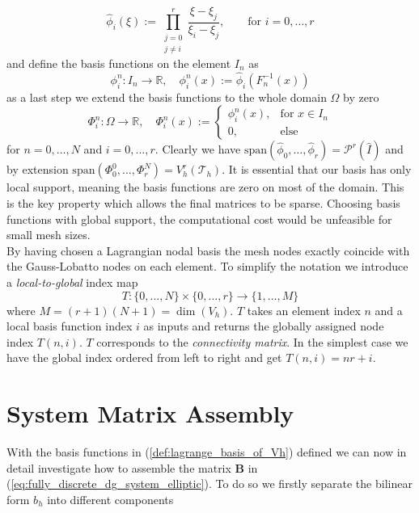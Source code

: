 \begin{equation}
	\label{def:lagrange_ref_basis}
	\widehat{\phi}_i(\xi) := \prod_{\substack{j = 0 \\ j\neq i}}^{r}\frac{\xi - \xi_j}{\xi_i - \xi_j},
	\qquad \text{for } i=0,\ldots,r
\end{equation}
and define the basis functions on the element $I_n$ as
\begin{equation}
	\phi^n_i : I_n \to \mathbb{R}, \quad \phi^n_i(x) := \widehat{\phi}_i(F_n^{-1}(x))
	\nonumber
\end{equation}
as a last step we extend the basis functions to the whole domain $\Omega$ by zero
\begin{equation}
	\Phi_i^n: \Omega \to \mathbb{R}, \quad \Phi_i^n(x) :=
	\begin{cases}
		\phi_i^n(x), & \text{for } x\in I_n \\
		0,           & \text{else}
	\end{cases}
	\label{def:lagrange_basis_of_Vh}
\end{equation}
for $n=0,\ldots,N$ and $i=0,\ldots,r$. Clearly we have $\text{span}( \widehat{\phi}_0, \ldots, \widehat{\phi}_r) = \mathcal{P}^r(\hat{I})$
and by extension $\text{span}(\Phi_0^0,\ldots,\Phi_r^N) = V_h^r(\mathcal{T}_h)$. It is essential
that our basis has only local support, meaning the basis functions are zero on most of the domain. This is the key property which
allows the final matrices to be sparse. Choosing basis functions with global support, the computational cost would be unfeasible for
small mesh sizes. \\
By having chosen a Lagrangian nodal basis the mesh nodes exactly coincide with the Gauss-Lobatto nodes on each
element.
To simplify the notation we introduce a \textit{local-to-global} index map
\begin{equation}
	\label{def:local_to_global_map}
	T: \{0,\ldots,N\} \times \{0,\ldots,r\} \to \{1,\ldots,M\}
\end{equation}
where $M = (r+1)(N+1) = \dim(V_h)$. $T$ takes an element index $n$ and a local basis function index $i$ as inputs
and returns the globally assigned node index $T(n,i)$. $T$ corresponds to the
\textit{connectivity matrix}. In the simplest case we have the global index ordered from left to right and get
$T(n,i) = nr + i$.


\section{System Matrix Assembly}
With the basis functions in (\ref{def:lagrange_basis_of_Vh}) defined we can now in detail investigate how
to assemble the matrix $\textbf{B}$ in (\ref{eq:fully_discrete_dg_system_elliptic}). To do so we firstly separate
the bilinear form $b_h$ into different components

